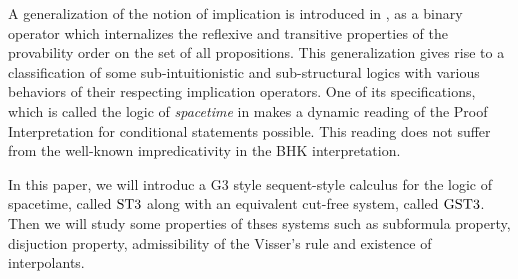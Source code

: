 A generalization of the notion of implication is introduced in \cite{amir}, as a binary operator which internalizes the reflexive and transitive properties of the provability order on the set of all propositions. This generalization gives rise to a classification of some sub-intuitionistic and sub-structural logics with various behaviors of their respecting implication operators. One of its specifications, which is called the logic of \emph{spacetime} in \cite{amir} makes a dynamic reading of the Proof Interpretation for conditional statements possible. This reading does not suffer from the well-known impredicativity in the BHK interpretation.

In this paper, we will introduc a G3 style sequent-style calculus for the logic of spacetime, called $\text{ST3}$ along with an equivalent cut-free system, called $\text{GST3}$. Then we will study some properties of thses systems such as subformula property, disjuction property, admissibility of the Visser's rule and existence of interpolants.